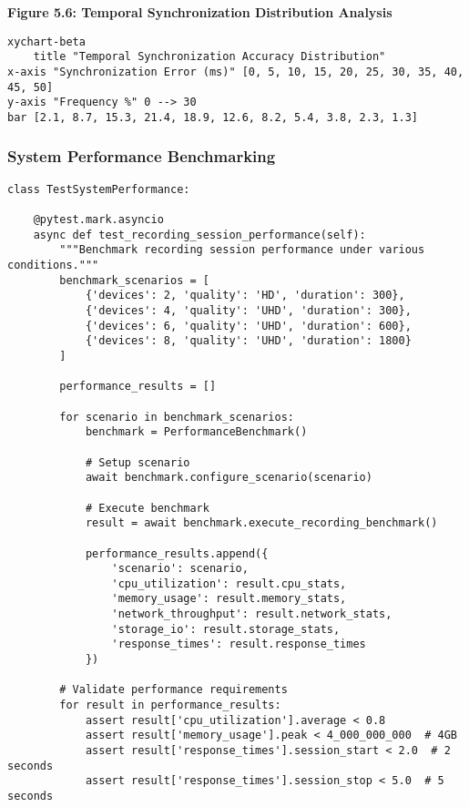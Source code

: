 \documentclass[12pt,a4paper]{report}
\begin{document}
\textbf{Figure 5.6: Temporal Synchronization Distribution Analysis}

\begin{verbatim}
xychart-beta
    title "Temporal Synchronization Accuracy Distribution"
x-axis "Synchronization Error (ms)" [0, 5, 10, 15, 20, 25, 30, 35, 40, 45, 50]
y-axis "Frequency %" 0 --> 30
bar [2.1, 8.7, 15.3, 21.4, 18.9, 12.6, 8.2, 5.4, 3.8, 2.3, 1.3]
\end{verbatim}

\subsubsection{System Performance Benchmarking}

\begin{verbatim}
class TestSystemPerformance:

    @pytest.mark.asyncio
    async def test_recording_session_performance(self):
        """Benchmark recording session performance under various conditions."""
        benchmark_scenarios = [
            {'devices': 2, 'quality': 'HD', 'duration': 300},
            {'devices': 4, 'quality': 'UHD', 'duration': 300},
            {'devices': 6, 'quality': 'UHD', 'duration': 600},
            {'devices': 8, 'quality': 'UHD', 'duration': 1800}
        ]

        performance_results = []

        for scenario in benchmark_scenarios:
            benchmark = PerformanceBenchmark()

            # Setup scenario
            await benchmark.configure_scenario(scenario)

            # Execute benchmark
            result = await benchmark.execute_recording_benchmark()

            performance_results.append({
                'scenario': scenario,
                'cpu_utilization': result.cpu_stats,
                'memory_usage': result.memory_stats,
                'network_throughput': result.network_stats,
                'storage_io': result.storage_stats,
                'response_times': result.response_times
            })

        # Validate performance requirements
        for result in performance_results:
            assert result['cpu_utilization'].average < 0.8
            assert result['memory_usage'].peak < 4_000_000_000  # 4GB
            assert result['response_times'].session_start < 2.0  # 2 seconds
            assert result['response_times'].session_stop < 5.0  # 5 seconds


\end{verbatim}
\end{document}
